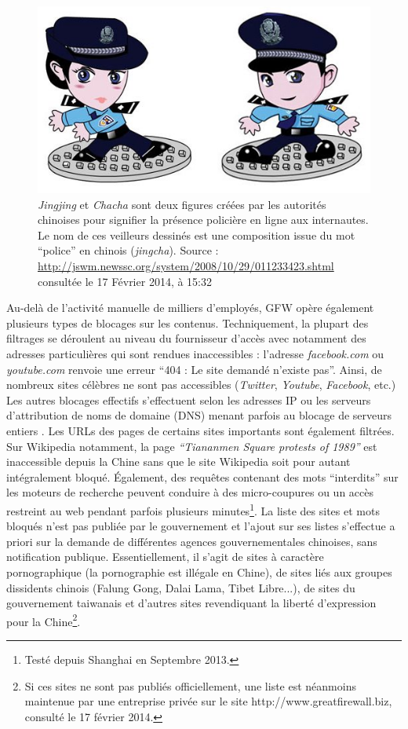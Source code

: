\begin{figure}[htbp]
    \centering
    \includegraphics{figures/chap1/jingcha.jpg}
    \caption[Jingjing et Chacha, les policiers de l'Internet chinois]{\textit{Jingjing} et \textit{Chacha} sont deux figures créées par les autorités chinoises pour signifier la présence policière en ligne aux internautes. Le nom de ces veilleurs dessinés est une composition issue du mot “police” en chinois (\textit{jingcha}). Source : \url{http://jswm.newssc.org/system/2008/10/29/011233423.shtml} consultée le 17 Février 2014, à 15:32}
    \label{fig:jingcha}
\end{figure}

Au-delà de l’activité manuelle de milliers d’employés, GFW opère également plusieurs types de blocages sur les contenus. Techniquement, la plupart des filtrages se déroulent au niveau du fournisseur d’accès avec notamment des adresses particulières qui sont rendues inaccessibles : l’adresse \textit{facebook.com} ou \textit{youtube.com} renvoie une erreur “404 : Le site demandé n’existe pas”. Ainsi, de nombreux sites célèbres ne sont pas accessibles (\textit{Twitter}, \textit{Youtube}, \textit{Facebook}, etc.) Les autres blocages effectifs s’effectuent selon les adresses IP ou les serveurs d’attribution de noms de domaine (DNS) menant parfois au blocage de serveurs entiers \citep{Winter2012}. Les URLs des pages de certains sites importants sont également filtrées. Sur Wikipedia notamment, la page \textit{“Tiananmen Square protests of 1989”} est inaccessible depuis la Chine sans que le site Wikipedia soit pour autant intégralement bloqué. Également, des requêtes contenant des mots “interdits” sur les moteurs de recherche peuvent conduire à des micro-coupures ou un accès restreint au web pendant parfois plusieurs minutes\footnote{Testé depuis Shanghai en Septembre 2013.}. La liste des sites et mots bloqués n’est pas publiée par le gouvernement et l’ajout sur ses listes s’effectue a priori sur la demande de différentes agences gouvernementales chinoises, sans notification publique. Essentiellement, il s’agit de sites à caractère pornographique (la pornographie est illégale en Chine), de sites liés aux groupes dissidents chinois (Falung Gong, Dalai Lama, Tibet Libre...), de sites du gouvernement taiwanais et d’autres sites revendiquant la liberté d’expression pour la Chine\footnote{Si ces sites ne sont pas publiés officiellement, une liste est néanmoins maintenue par une entreprise privée sur le site http://www.greatfirewall.biz, consulté le 17 février 2014.}.

